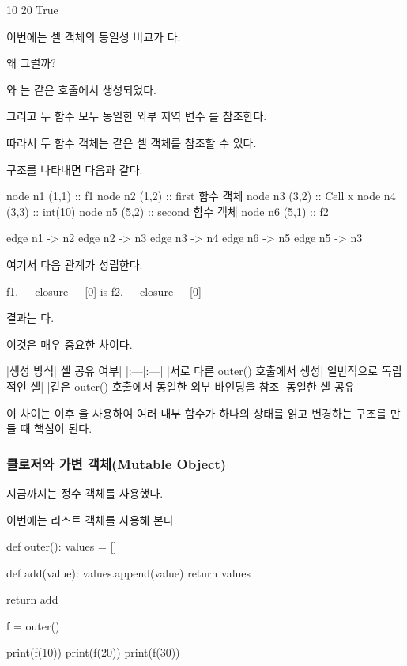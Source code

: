 \begin{dhkzsh}
10
20
True
\end{dhkzsh}

이번에는 셀 객체의 동일성 비교가 다.

왜 그럴까?

와 는 같은  호출에서 생성되었다.

그리고 두 함수 모두 동일한 외부 지역 변수 를 참조한다.

따라서 두 함수 객체는 같은 셀 객체를 참조할 수 있다.

구조를 나타내면 다음과 같다.

\begin{dhkdiagram}[in=6]
node n1 (1,1) :: f1
node n2 (1,2) :: first 함수 객체
node n3 (3,2) :: Cell x
node n4 (3,3) :: int(10)
node n5 (5,2) :: second 함수 객체
node n6 (5,1) :: f2

edge n1 -> n2
edge n2 -> n3
edge n3 -> n4
edge n6 -> n5
edge n5 -> n3
\end{dhkdiagram}

여기서 다음 관계가 성립한다.

\begin{dhkcode}
f1.__closure__[0] is f2.__closure__[0]
\end{dhkcode}

결과는 다.

이것은 매우 중요한 차이다.

\begin{dhktable}
|생성 방식|	셀 공유 여부|
|:---|:---|
|서로 다른 outer() 호출에서 생성|	일반적으로 독립적인 셀|
|같은 outer() 호출에서 동일한 외부 바인딩을 참조|	동일한 셀 공유|
\end{dhktable}

이 차이는 이후 을 사용하여 여러 내부 함수가 하나의 상태를 읽고 변경하는 구조를 만들 때 핵심이 된다.

\subsubsection{클로저와 가변 객체(Mutable Object)}

지금까지는 정수 객체를 사용했다.

이번에는 리스트 객체를 사용해 본다.

\begin{dhkcode}
def outer():
    values = []

    def add(value):
        values.append(value)
        return values

    return add


f = outer()

print(f(10))
print(f(20))
print(f(30))
\end{dhkcode}

